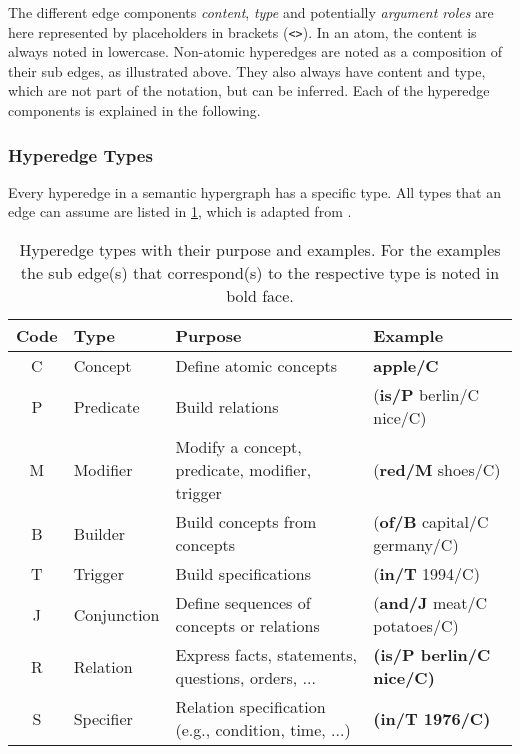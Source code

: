 \documentclass[11pt]{scrreprt}
\let\citef\cite  %
\let\cite\parencite  %
\begin{document}
The different edge components \textit{content}, \textit{type} and potentially \textit{argument roles} are here represented by placeholders in brackets (\texttt{<>}). In an atom, the content is always noted in lowercase. Non-atomic hyperedges are noted as a composition of their sub edges, as illustrated above. They also always have content and type, which are not part of the notation, but can be inferred. Each of the hyperedge components is explained in the following.

\subsubsection{Hyperedge Types}
Every hyperedge in a semantic hypergraph has a specific type. All types that an edge can assume are listed in \cref{tab:hyperedge-types}, which is adapted from \citef[p. 7]{menezesSemanticHypergraphs2021}.

\begin{table}[h]
\centering
\begin{tabular}{clp{5cm}l}
\toprule
\textbf{Code} & \textbf{Type} & \textbf{Purpose} & \textbf{Example} \\
\midrule
\textsf{C} & Concept & Define atomic concepts & \textbf{\textsf{apple/C}} \\
\textsf{P} & Predicate & Build relations & \textsf{(\textbf{is/P} berlin/C nice/C)} \\
\textsf{M} & Modifier & Modify a concept, predicate, modifier, trigger & \textsf{(\textbf{red/M} shoes/C)} \\
\textsf{B} & Builder & Build concepts from concepts & \textsf{(\textbf{of/B} capital/C germany/C)} \\
\textsf{T} & Trigger & Build specifications & \textsf{(\textbf{in/T} 1994/C)} \\
\textsf{J} & Conjunction & Define sequences of concepts or relations & \textsf{(\textbf{and/J} meat/C potatoes/C)} \\
\textsf{R} & Relation & Express facts, statements, questions, orders, ... & \textsf{\textbf{(is/P berlin/C nice/C)}} \\
\textsf{S} & Specifier & Relation specification (e.g., condition, time, ...) & \textsf{\textbf{(in/T 1976/C)}} \\
\bottomrule
\end{tabular}
\caption{Hyperedge types with their purpose and examples. For the examples the sub edge(s) that correspond(s) to the respective type is noted in bold face.}
\label{tab:hyperedge-types}
\end{table}
\end{document}
